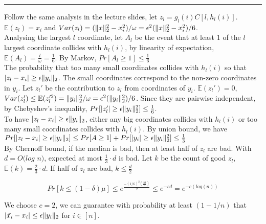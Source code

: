 \documentclass[11pt]{article}
\begin{document}




\begin{quote}

\end{quote}
\hrule


\begin{solution}
\item
  Follow the same analysis in the lecture slides, let $z_l = g_l(i)C[l,h_l(i)]$. $\mathbb{E}(z_l) = x_i$ and $Var(z_l) =  (\mathopen\| x \mathclose\|^2_2 - x_i^2)/ \omega = \epsilon^2(\mathopen\| x \mathclose\|^2_2 - x_i^2)/6$.\\

    Analysing the largest $l$ coordinate, let $A_l$ be the event that at least $1$ of the $l$ largest coordinate collides with $h_l(i)$, by linearity of expectation, $\mathbb{E}(A_l) = \frac{l}{\omega} = \frac{1}{6}$. By Markov, $Pr[A_l \geq 1] \leq \frac{1}{6}$\\
    
    The probability that too many small coordinates collides with $h_l(i)$ so that $|z_l - x_i| \geq \epsilon\mathopen\| y_i \mathclose\|_2$. The small coordinates correspond to the non-zero coordinates in $y_i$. Let $z_l'$ be the contribution to $z_l$ from coordinates of $y_i$. $\mathbb{E}(z_l') = 0$, $Var(z_l') \leq \mathbb{E}(z_l'^2) = \mathopen\| y_i \mathclose\|^2_2/\omega = \epsilon^2(\mathopen\| y_i \mathclose\|^2_2)/6$. Since they are pairwise independent, by Chebyshev's inequality, $Pr[|z_l'| \geq \epsilon\mathopen\| y_i \mathclose\|^2_2] \leq \frac{1}{6}. $ \\
    
    To have $|z_l - x_i| \geq \epsilon\mathopen\| y_i \mathclose\|_2$, either any big coordinates collides with $h_l(i)$ or too many small coordinates collides with $h_l(i)$. By union bound, we have $Pr[|z_l - x_i| \geq \epsilon\mathopen\| y_i \mathclose\|_2] \leq Pr[A \geq 1] + Pr[|y_i| \geq \epsilon\mathopen\| y_i \mathclose\|^2_2] \leq \frac{1}{3}$\\
    
    By Chernoff bound, if the median is bad, then at least half of $z_l$ are bad. With $d = O(log$ $n)$, expected at most $\frac{1}{3}\cdot d$ is bad. Let $k$ be the count of good $z_l$, $\mathbb{E}(k) = \frac{2}{3} \cdot d$. If half of $z_l$ are bad, $k \leq \frac{d}{2}$
    
    $$ Pr[k \leq (1 - \delta)\mu] \leq e^{\frac{-(1/6)^2(\frac{2d}{3})}{2}} \leq e^{-cd} = e^{-c(log(n))}$$
    
    We choose $c = 2$, we can guarantee with probability at least $(1 - 1/n)$ that $|\tilde{x_i} - x_i| \leq \epsilon\mathopen\| y_i \mathclose\|_2$ for $i \in [n]$.


\end{solution}
\end{document}

